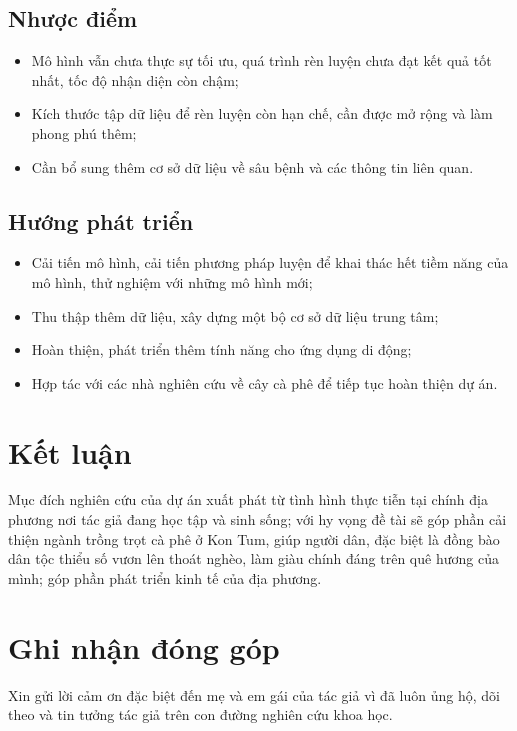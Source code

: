 \documentclass[a4paper,14pt]{extarticle}
\begin{document}
	\subsection{Nhược điểm}
	\begin{itemize}
		\item Mô hình vẫn chưa thực sự tối ưu, quá trình rèn luyện chưa đạt kết quả tốt nhất, tốc độ nhận diện còn chậm;
		\item Kích thước tập dữ liệu để rèn luyện còn hạn chế, cần được mở rộng và làm phong phú thêm;
		\item Cần bổ sung thêm cơ sở dữ liệu về sâu bệnh và các thông tin liên quan.
	\end{itemize}

	\subsection{Hướng phát triển}
	\begin{itemize}
		\item Cải tiến mô hình, cải tiến phương pháp luyện để khai thác hết tiềm năng của mô hình, thử nghiệm với những mô hình mới;
		\item Thu thập thêm dữ liệu, xây dựng một bộ cơ sở dữ liệu trung tâm;
		\item Hoàn thiện, phát triển thêm tính năng cho ứng dụng di động;
		\item Hợp tác với các nhà nghiên cứu về cây cà phê để tiếp tục hoàn thiện dự án.
	\end{itemize}

\section{Kết luận}
Mục đích nghiên cứu của dự án xuất phát từ tình hình thực tiễn tại chính địa phương nơi tác giả đang học tập và sinh sống; với hy vọng đề tài sẽ góp phần cải thiện ngành trồng trọt cà phê ở Kon Tum, giúp người dân, đặc biệt là đồng bào dân tộc thiểu số vươn lên thoát nghèo, làm giàu chính đáng trên quê hương của mình; góp phần phát triển kinh tế của địa phương.

\section{Ghi nhận đóng góp}
Xin gửi lời cảm ơn đặc biệt đến mẹ và em gái của tác giả vì đã luôn ủng hộ, dõi theo và tin tưởng tác giả trên con đường nghiên cứu khoa học.

\null
\end{document}
